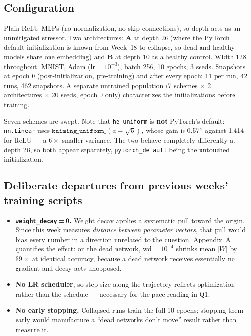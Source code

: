 \documentclass[11pt]{article}
\begin{document}
\subsection{Configuration}

Plain ReLU MLPs (no normalization, no skip connections), so depth acts as an unmitigated
stressor. Two architectures: \textbf{A} at depth 26 (where the PyTorch default initialization is
known from Week~18 to collapse, so dead and healthy models share one embedding) and \textbf{B} at
depth 10 as a healthy control. Width 128 throughout. MNIST, Adam ($\text{lr}=10^{-3}$), batch
256, 10 epochs, 3 seeds. Snapshots at epoch 0 (post-initialization, pre-training) and after every
epoch: 11 per run, 42 runs, 462 snapshots. A separate untrained population (7 schemes $\times$ 2
architectures $\times$ 20 seeds, epoch 0 only) characterizes the initializations before training.

Seven schemes are swept. Note that \texttt{he\_uniform} is \textbf{not} PyTorch's default:
\texttt{nn.Linear} uses $\texttt{kaiming\_uniform\_}(a{=}\sqrt5)$, whose gain is 0.577 against
1.414 for ReLU --- a $6\times$ smaller variance. The two behave completely differently at depth
26, so both appear separately, \texttt{pytorch\_default} being the untouched initialization.

\subsection{Deliberate departures from previous weeks' training scripts}

\begin{itemize}
\item \textbf{\texttt{weight\_decay}\,=\,0.} Weight decay applies a systematic pull toward the
origin. Since this week measures \emph{distance between parameter vectors}, that pull would bias
every number in a direction unrelated to the question. Appendix~A quantifies the effect: on the
dead network, $\text{wd}=10^{-4}$ shrinks mean $|W|$ by $89\times$ at identical accuracy, because
a dead network receives essentially no gradient and decay acts unopposed.
\item \textbf{No LR scheduler}, so step size along the trajectory reflects optimization rather
than the schedule --- necessary for the pace reading in Q1.
\item \textbf{No early stopping.} Collapsed runs train the full 10 epochs; stopping them early
would manufacture a ``dead networks don't move'' result rather than measure it.
\end{itemize}
\end{document}
